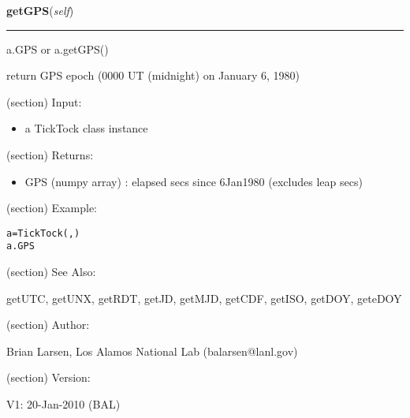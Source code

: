     \label{spacepy:spacetime:TickTock:getGPS}

    \vspace{0.5ex}

\hspace{.8\funcindent}\begin{boxedminipage}{\funcwidth}

    \raggedright \textbf{getGPS}(\textit{self})

    \vspace{-1.5ex}

    \rule{\textwidth}{0.5\fboxrule}
\setlength{\parskip}{2ex}
    a.GPS or a.getGPS()

    return GPS epoch (0000 UT (midnight) on January 6, 1980)

    (section) Input:

      \begin{itemize}
      \setlength{\parskip}{0.6ex}
        \item a TickTock class instance

      \end{itemize}

    (section) Returns:

      \begin{itemize}
      \setlength{\parskip}{0.6ex}
        \item GPS (numpy array) : elapsed secs since 6Jan1980 (excludes leap 
          secs)

      \end{itemize}

    (section) Example:

\begin{alltt}
\pysrcprompt{{\textgreater}{\textgreater}{\textgreater} }a = TickTock(, )
\pysrcprompt{{\textgreater}{\textgreater}{\textgreater} }a.GPS
\end{alltt}
    (section) See Also:

      getUTC, getUNX, getRDT, getJD, getMJD, getCDF, getISO, getDOY, 
      geteDOY

    (section) Author:

      Brian Larsen, Los Alamos National Lab (balarsen@lanl.gov)

    (section) Version:

      V1: 20-Jan-2010 (BAL)

\setlength{\parskip}{1ex}
    \end{boxedminipage}

